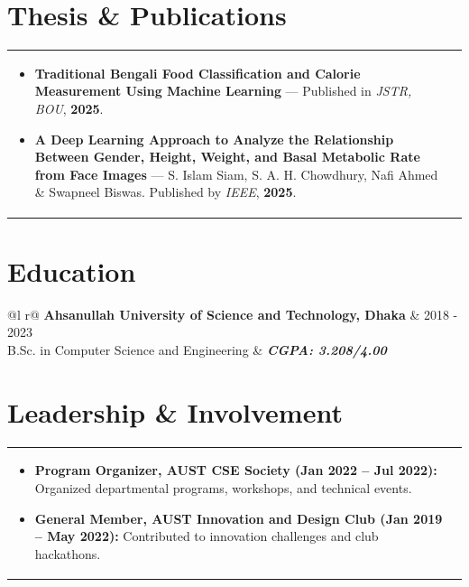 \documentclass[a4paper,8pt]{article}
\begin{document}
\vfill
\section{Thesis \& Publications}
\begin{tabularx}{\linewidth}{ @{}l r@{} }
\begin{minipage}[t]{\linewidth}
\begin{itemize}[nosep, after=\strut, leftmargin=1.5em, itemsep=1.5pt]
\item \textbf{Traditional Bengali Food Classification and Calorie Measurement Using Machine Learning} — Published in \textit{JSTR, BOU}, \textbf{2025}.
\item \textbf{A Deep Learning Approach to Analyze the Relationship Between Gender, Height, Weight, and Basal Metabolic Rate from Face Images} — S. Islam Siam, S. A. H. Chowdhury, Nafi Ahmed \& Swapneel Biswas. Published by \textit{IEEE}, \textbf{2025}.
\end{itemize}
\end{minipage}
\end{tabularx}

\vfill
\section{Education}
\begin{tabularx}{\linewidth}{ @{}l r@{} }
\color[HTML]{1C033C} \textbf{Ahsanullah University of Science and Technology, Dhaka} & \hfill \color[HTML]{371e77} 2018 - 2023 \\
\color[HTML]{371e77} B.Sc. in Computer Science and Engineering & \hfill \color[HTML]{4B28A4} \textit{\textbf{CGPA: 3.208/4.00}} \\
\end{tabularx}

\vfill
\section{Leadership \& Involvement}
\begin{tabularx}{\linewidth}{ @{}l r@{} }
\begin{minipage}[t]{\linewidth}
\begin{itemize}[nosep,after=\strut, leftmargin=1.5em, itemsep=1.5pt]
\item \textbf{Program Organizer, AUST CSE Society (Jan 2022 – Jul 2022):} Organized departmental programs, workshops, and technical events.
\item \textbf{General Member, AUST Innovation and Design Club (Jan 2019 – May 2022):} Contributed to innovation challenges and club hackathons.
\end{itemize}
\end{minipage}
\end{tabularx}
\end{document}
